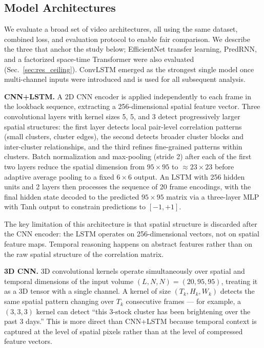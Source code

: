 \documentclass[runningheads]{llncs}
\begin{document}
\subsection{Model Architectures}\label{sec:architectures}

We evaluate a broad set of video architectures, all using the same
dataset, combined loss, and evaluation protocol to enable fair
comparison. We describe the three that anchor the study below;
EfficientNet transfer learning, PredRNN, and a factorized space-time
Transformer were also evaluated (Sec.~\ref{sec:res_ceiling}). ConvLSTM
emerged as the strongest single model once multi-channel inputs were
introduced and is used for all subsequent analysis.

\textbf{CNN+LSTM.} A 2D CNN encoder is applied independently to
each frame in the lookback sequence, extracting a 256-dimensional
spatial feature vector. Three convolutional layers with kernel sizes
5, 5, and 3 detect progressively larger spatial structures: the
first layer detects local pair-level correlation patterns (small
clusters, cluster edges), the second detects broader cluster blocks
and inter-cluster relationships, and the third refines fine-grained
patterns within clusters. Batch normalization and max-pooling
(stride 2) after each of the first two layers reduce the spatial
dimension from $95\times95$ to $\approx23\times23$ before adaptive
average pooling to a fixed $6\times6$ output. An LSTM with 256
hidden units and 2 layers then processes the sequence of 20 frame
encodings, with the final hidden state decoded to the predicted
$95\times95$ matrix via a three-layer MLP with Tanh output to
constrain predictions to $[-1, +1]$.

The key limitation of this architecture is that spatial structure is
discarded after the CNN encoder: the LSTM operates on 256-dimensional
vectors, not on spatial feature maps. Temporal reasoning happens on
abstract features rather than on the raw spatial structure of the
correlation matrix.

\textbf{3D CNN.} 3D convolutional kernels operate simultaneously
over spatial and temporal dimensions of the input volume
$(L, N, N) = (20, 95, 95)$, treating it as a 3D tensor with a
single channel. A kernel of size $(T_k, H_k, W_k)$ detects the
same spatial pattern changing over $T_k$ consecutive frames ---
for example, a $(3,3,3)$ kernel can detect ``this 3-stock cluster
has been brightening over the past 3 days.'' This is more direct
than CNN+LSTM because temporal context is captured at the level
of spatial pixels rather than at the level of compressed feature
vectors.
\end{document}
